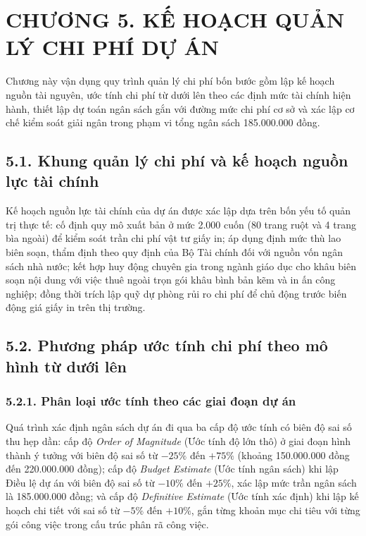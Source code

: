\section{CHƯƠNG 5. KẾ HOẠCH QUẢN LÝ CHI PHÍ DỰ ÁN}

Chương này vận dụng quy trình quản lý chi phí bốn bước gồm lập kế hoạch nguồn tài nguyên, ước tính chi phí từ dưới lên theo các định mức tài chính hiện hành, thiết lập dự toán ngân sách gắn với đường mức chi phí cơ sở và xác lập cơ chế kiểm soát giải ngân trong phạm vi tổng ngân sách 185.000.000 đồng.

\subsection{5.1. Khung quản lý chi phí và kế hoạch nguồn lực tài chính}

Kế hoạch nguồn lực tài chính của dự án được xác lập dựa trên bốn yếu tố quản trị thực tế: cố định quy mô xuất bản ở mức 2.000 cuốn (80 trang ruột và 4 trang bìa ngoài) để kiểm soát trần chi phí vật tư giấy in; áp dụng định mức thù lao biên soạn, thẩm định theo quy định của Bộ Tài chính đối với nguồn vốn ngân sách nhà nước; kết hợp huy động chuyên gia trong ngành giáo dục cho khâu biên soạn nội dung với việc thuê ngoài trọn gói khâu bình bản kẽm và in ấn công nghiệp; đồng thời trích lập quỹ dự phòng rủi ro chi phí để chủ động trước biến động giá giấy in trên thị trường.

\subsection{5.2. Phương pháp ước tính chi phí theo mô hình từ dưới lên}

\subsubsection{5.2.1. Phân loại ước tính theo các giai đoạn dự án}

Quá trình xác định ngân sách dự án đi qua ba cấp độ ước tính có biên độ sai số thu hẹp dần: cấp độ \textit{Order of Magnitude} (Ước tính độ lớn thô) ở giai đoạn hình thành ý tưởng với biên độ sai số từ $-25\%$ đến $+75\%$ (khoảng 150.000.000 đồng đến 220.000.000 đồng); cấp độ \textit{Budget Estimate} (Ước tính ngân sách) khi lập Điều lệ dự án với biên độ sai số từ $-10\%$ đến $+25\%$, xác lập mức trần ngân sách là 185.000.000 đồng; và cấp độ \textit{Definitive Estimate} (Ước tính xác định) khi lập kế hoạch chi tiết với sai số từ $-5\%$ đến $+10\%$, gắn từng khoản mục chi tiêu với từng gói công việc trong cấu trúc phân rã công việc.

